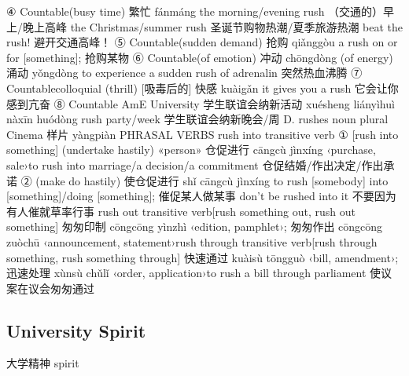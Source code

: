 \documentclass[11pt]{ctexart}
\begin{document}
{{{{④ Countable(busy time) 繁忙 fánmáng the morning/evening rush （交通的）早上/晚上高峰 the Christmas/summer rush 圣诞节购物热潮/夏季旅游热潮 beat the rush! 避开交通高峰！
⑤ Countable(sudden demand) 抢购 qiǎnggòu a rush on or for [something]; 抢购某物
⑥ Countable(of emotion) 冲动 chōngdòng (of energy) 涌动 yǒngdòng to experience a sudden rush of adrenalin 突然热血沸腾
⑦ Countablecolloquial (thrill) [吸毒后的] 快感 kuàigǎn it gives you a rush 它会让你感到亢奋
⑧ Countable AmE University 学生联谊会纳新活动 xuésheng liányìhuì nàxīn huódòng rush party/week 学生联谊会纳新晚会/周
D. rushes noun plural Cinema 样片 yàngpiàn PHRASAL VERBS rush into transitive verb
① [rush into something] (undertake hastily) «person» 仓促进行 cāngcù jìnxíng ‹purchase, sale›to rush into marriage/a decision/a commitment 仓促结婚/作出决定/作出承诺
② (make do hastily) 使仓促进行 shǐ cāngcù jìnxíng to rush [somebody] into [something]/doing [something]; 催促某人做某事 don't be rushed into it 不要因为有人催就草率行事 rush out transitive verb[rush something out, rush out something] 匆匆印制 cōngcōng yìnzhì ‹edition, pamphlet›; 匆匆作出 cōngcōng zuòchū ‹announcement, statement›rush through transitive verb[rush through something, rush something through] 快速通过 kuàisù tōngguò ‹bill, amendment›; 迅速处理 xùnsù chǔlǐ ‹order, application›to rush a bill through parliament 使议案在议会匆匆通过

\subsection{University Spirit}
\label{sec:orgb11d42c}
大学精神
spirit

}}}}
\end{document}
